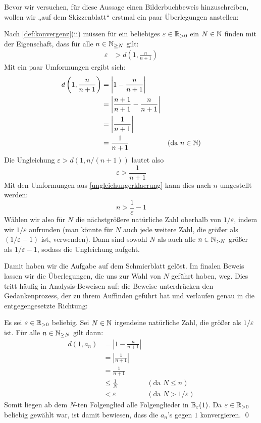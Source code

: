 \begin{bem}
    Bevor wir versuchen, für diese Aussage einen Bilderbuchbeweis hinzuschreiben, wollen wir „auf dem Skizzenblatt“ erstmal ein paar Überlegungen anstellen:
    
    Nach \cref{def:konvergenz}(ii) müssen für ein beliebiges $\varepsilon \in \mathbb R_{>0}$ ein $N\in \mathbb N$ finden mit der Eigenschaft, dass für alle $n\in \mathbb N_{\ge N}$ gilt:
    \begin{align*}
        \varepsilon &  > d\left(1,\frac{n}{n+1}\right)
    \end{align*}
    Mit ein paar Umformungen ergibt sich:
    \begin{align*}
        d\left(1,\frac{n}{n+1}\right) & = \left| 1-\frac{n}{n+1}\right| \\
        & = \left| \frac{n+1}{n+1} - \frac{n}{n+1} \right| \\
        & = \left| \frac{1}{n+1}\right| \\
        & = \frac{1}{n+1} & (\text{da $n\in \mathbb N$})
    \end{align*}
    Die Ungleichung $\varepsilon >d(1,n/(n+1))$ lautet also
        \[ \varepsilon > \frac{1}{n+1} \]
    Mit den Umformungen aus \cref{ungleichungerklaerung} kann dies nach $n$ umgestellt werden:
        \[ n > \frac{1}{\varepsilon} -1  \]
    Wählen wir also für $N$ die nächstgrößere natürliche Zahl oberhalb von $1/\varepsilon$, indem wir $1/\varepsilon$ aufrunden (man könnte für $N$ auch jede weitere Zahl, die größer als $(1/\varepsilon -1)$ ist, verwenden). Dann sind sowohl $N$ als auch alle $n\in \mathbb N_{>N}$ größer als $1/\varepsilon- 1$, sodass die Ungleichung aufgeht.
    
    Damit haben wir die Aufgabe auf dem Schmierblatt gelöst. Im finalen Beweis lassen wir die Überlegungen, die uns zur Wahl von $N$ geführt haben, weg. Dies tritt häufig in Analysis-Beweisen auf: die Beweise unterdrücken den Gedankenprozess, der zu ihrem Auffinden geführt hat und verlaufen genau in die entgegengesetzte Richtung:
\end{bem}


\begin{bew}
    Es sei $\varepsilon \in \mathbb R_{>0}$ beliebig. Sei $N\in \mathbb N$ irgendeine natürliche Zahl, die größer als $1/\varepsilon$ ist. Für alle $n\in \mathbb N_{\ge N}$ gilt dann:
    \begingroup
    \allowdisplaybreaks
    \begin{align*}
        d(1,a_n) & = \left| 1-\frac{n}{n+1}\right| \\
        & = \left| \frac{1}{n+1} \right| \\
        & = \frac{1}{n+1} \\
        & \le \frac{1}{N} & (\text{da $N\le n$})\\
        & < \varepsilon & (\text{da $N> 1/\varepsilon$})
    \end{align*}
    \endgroup
    Somit liegen ab dem $N$-ten Folgenglied alle Folgenglieder in $\mathbb B_\varepsilon(1)$. Da $\varepsilon \in \mathbb R_{>0}$ beliebig gewählt war, ist damit bewiesen, dass die $a_n$'s gegen $1$ konvergieren. \qed
\end{bew}


